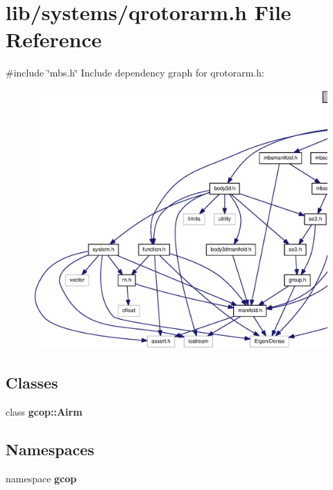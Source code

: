 \section{lib/systems/qrotorarm.h \-File \-Reference}
\label{qrotorarm_8h}
{\ttfamily \#include \char`\"{}mbs.\-h\char`\"{}}\*
\-Include dependency graph for qrotorarm.\-h\-:
\nopagebreak
\begin{figure}[H]
\begin{center}
\leavevmode
\includegraphics[width=350pt]{qrotorarm_8h__incl}
\end{center}
\end{figure}
\subsection*{\-Classes}
\begin{DoxyCompactItemize}
\item 
class {\bf gcop\-::\-Airm}
\end{DoxyCompactItemize}
\subsection*{\-Namespaces}
\begin{DoxyCompactItemize}
\item 
namespace {\bf gcop}
\end{DoxyCompactItemize}
